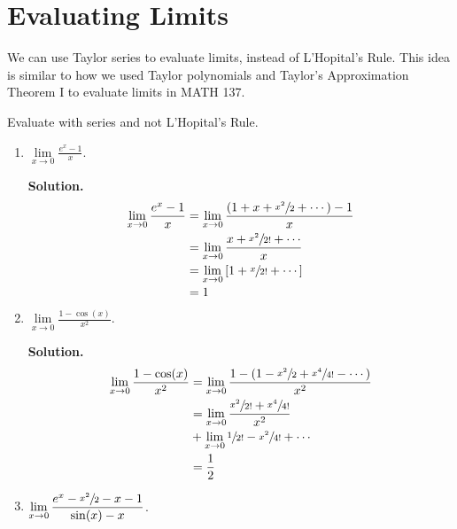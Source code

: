 \section*{Evaluating Limits}
We can use Taylor series to evaluate limits, instead
of L'Hopital's Rule. This idea is similar to how we used Taylor
polynomials and Taylor's Approximation Theorem I to evaluate
limits in MATH 137.

\begin{Example}{}{}
    Evaluate with series and not L'Hopital's Rule.

    \begin{enumerate}
        \item $ \displaystyle \lim\limits_{{x} \to {0}} \frac{e^x-1}{x} $.

              \textbf{Solution.}
              \begin{align*}
                  \lim\limits_{{x} \to {0}} \frac{e^x-1}{x}
                   & =\lim\limits_{{x} \to {0}} \frac{\left( 1+x+\sfrac{x^2}{2} +\cdots \right)-1}{x} \\
                   & =\lim\limits_{{x} \to {0}}
                  \frac{x+\sfrac{x^2}{2!} +\cdots}{x}                                                 \\
                   & =\lim\limits_{{x} \to {0}} \left[ 1+\sfrac{x}{2!}+\cdots \right]                 \\
                   & =1
              \end{align*}

        \item $ \displaystyle \lim\limits_{{x} \to {0}} \frac{1-\cos(x)}{x^2} $.

              \textbf{Solution.}
              \begin{align*}
                  \lim\limits_{{x} \to {0}} \frac{1-\cos(x)}{x^2}
                   & =\lim\limits_{{x} \to {0}}
                  \frac{1-\left( 1-\sfrac{x^2}{2} +\sfrac{x^4}{4!} -\cdots \right)}{x^2}     \\
                   & =\lim\limits_{{x} \to {0}} \frac{\sfrac{x^2}{2!}+\sfrac{x^4}{4!} }{x^2} \\
                   & +\lim\limits_{{x} \to {0}} \sfrac{1}{2!} -\sfrac{x^2}{4!} +\cdots       \\
                   & =\frac{1}{2}
              \end{align*}

        \item $ \displaystyle \lim\limits_{{x} \to {0}} \frac{e^x-\sfrac{x^2}{2} -x-1}{\sin(x)-x} $.


\end{enumerate}
\end{Example}
